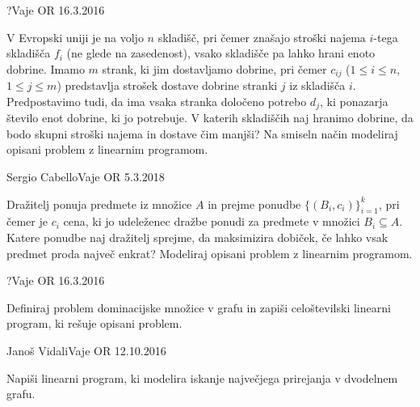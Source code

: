 \begin{naloga}{?}{Vaje OR 16.3.2016}
\begin{vprasanje}
V Evropski uniji je na voljo $n$ skladišč,
pri čemer znašajo stroški najema $i$-tega skladišča $f_i$
(ne glede na zasedenost),
vsako skladišče pa lahko hrani enoto dobrine.
Imamo $m$ strank, ki jim dostavljamo dobrine,
pri čemer $c_{ij}$ ($1 \le i \le n$, $1 \le j \le m$)
predstavlja strošek dostave dobrine stranki $j$ iz skladišča $i$.
Predpostavimo tudi, da ima vsaka stranka določeno potrebo $d_j$,
ki ponazarja število enot dobrine, ki jo potrebuje.
V katerih skladiščih naj hranimo dobrine,
da bodo skupni stroški najema in dostave čim manjši?
Na smiseln način modeliraj opisani problem z linearnim programom.
\end{vprasanje}
\begin{odgovor}
\end{odgovor}
\end{naloga}


\begin{naloga}%
{Sergio Cabello}{Vaje OR 5.3.2018}
\begin{vprasanje}
Dražitelj ponuja predmete iz množice $A$
in prejme ponudbe $\{(B_i, c_i)\}_{i=1}^k$,
pri čemer je $c_i$ cena,
ki jo udeleženec dražbe ponudi za predmete v množici $B_i \subseteq A$.
Katere ponudbe naj dražitelj sprejme,
da maksimizira dobiček,
če lahko vsak predmet proda največ enkrat?
Modeliraj opisani problem z linearnim programom.
\end{vprasanje}
\begin{odgovor}
\end{odgovor}
\end{naloga}


\begin{naloga}{?}{Vaje OR 16.3.2016}
\begin{vprasanje}
Definiraj problem dominacijske množice v grafu
in zapiši celoštevilski linearni program,
ki rešuje opisani problem.
\end{vprasanje}
\begin{odgovor}
\end{odgovor}
\end{naloga}


\begin{naloga}{Janoš Vidali}{Vaje OR 12.10.2016}
\begin{vprasanje}
Napiši linearni program,
ki modelira iskanje največjega prirejanja v dvodelnem grafu.
\end{vprasanje}
\begin{odgovor}
\end{odgovor}
\end{naloga}


